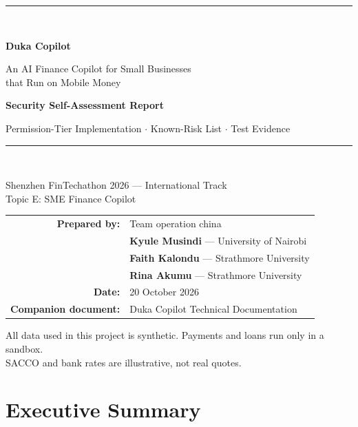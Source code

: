 \documentclass[10pt,a4paper]{article}
\begin{document}
\begin{titlepage}
\centering
\vspace*{2.2cm}
{\color{navy}\rule{\linewidth}{1.4pt}}\\[1.2cm]
{\Huge\bfseries\color{navy} Duka Copilot\par}
\vspace{0.4cm}
{\Large An AI Finance Copilot for Small Businesses\\that Run on Mobile Money\par}
\vspace{0.9cm}
{\LARGE\bfseries Security Self-Assessment Report\par}
\vspace{0.3cm}
{\large Permission-Tier Implementation $\cdot$ Known-Risk List $\cdot$ Test Evidence\par}
\vspace{1.2cm}
{\color{navy}\rule{\linewidth}{1.4pt}}\\[1.4cm]
{\large Shenzhen FinTechathon 2026 --- International Track\\[2pt]
Topic E: SME Finance Copilot\par}
\vspace{2.2cm}
\begin{tabular}{rl}
\textbf{Prepared by:} & Team operation china\\
 & \textbf{Kyule Musindi} --- University of Nairobi\\
 & \textbf{Faith Kalondu} --- Strathmore University\\
 & \textbf{Rina Akumu} --- Strathmore University\\[3pt]
\textbf{Date:} & 20 October 2026\\
\textbf{Companion document:} & Duka Copilot Technical Documentation\\
\end{tabular}
\vfill
{\small\color{gray} All data used in this project is synthetic. Payments and loans run only in a sandbox.\\
SACCO and bank rates are illustrative, not real quotes.}
\end{titlepage}

\tableofcontents
\clearpage

\section{Executive Summary}
\end{document}
